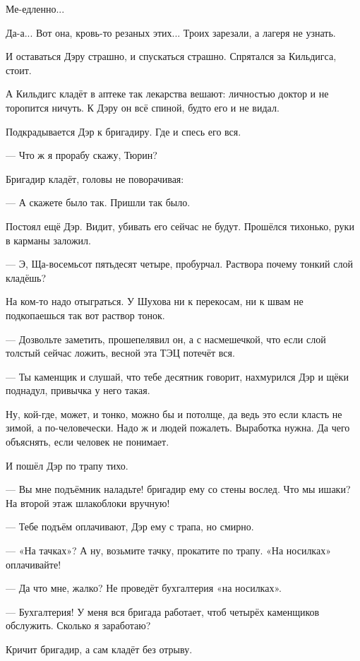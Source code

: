 Ме-едленно...

Да-а... Вот она, кровь-то резаных этих... Троих зарезали, а лагеря не узнать.

И оставаться Дэру страшно, и спускаться страшно. Спрятался за Кильдигса, стоит.

А Кильдигс кладёт \dash в аптеке так лекарства вешают: личностью доктор и не торопится ничуть. К
Дэру он всё спиной, будто его и не видал.

Подкрадывается Дэр к бригадиру. Где и спесь его вся.

--- Что ж я прорабу скажу, Тюрин?

Бригадир кладёт, головы не поворачивая:

--- А скажете \dash было так. Пришли \dash так было.

Постоял ещё Дэр. Видит, убивать его сейчас не будут. Прошёлся тихонько, руки в карманы
заложил.

--- Э, Ща-восемьсот пятьдесят четыре, \dash пробурчал. \Dash Раствора почему тонкий слой кладёшь?

На ком-то надо отыграться. У Шухова ни к перекосам, ни к швам не подкопаешься \dash так вот
раствор тонок.

--- Дозвольте заметить, \dash прошепелявил он, а с насмешечкой, \Dash что если слой толстый сейчас
ложить, весной эта ТЭЦ потечёт вся.

--- Ты \dash каменщик и слушай, что тебе десятник говорит, \dash нахмурился Дэр и щёки поднадул,
привычка у него такая.

Ну, кой-где, может, и тонко, можно бы и потолще, да ведь это если класть не зимой, а
по-человечески. Надо ж и людей пожалеть. Выработка нужна. Да чего объяснять, если человек не
понимает.

И пошёл Дэр по трапу тихо.

--- Вы мне подъёмник наладьте! \dash бригадир ему со стены вослед. \Dash Что мы \dash ишаки? На второй этаж
шлакоблоки вручную!

--- Тебе подъём оплачивают, \dash Дэр ему с трапа, но смирно.

--- «На тачках»? А ну, возьмите тачку, прокатите по трапу. «На носилках» оплачивайте!

--- Да что мне, жалко? Не проведёт бухгалтерия «на носилках».

--- Бухгалтерия! У меня вся бригада работает, чтоб четырёх каменщиков обслужить. Сколько я
заработаю?

Кричит бригадир, а сам кладёт без отрыву.

